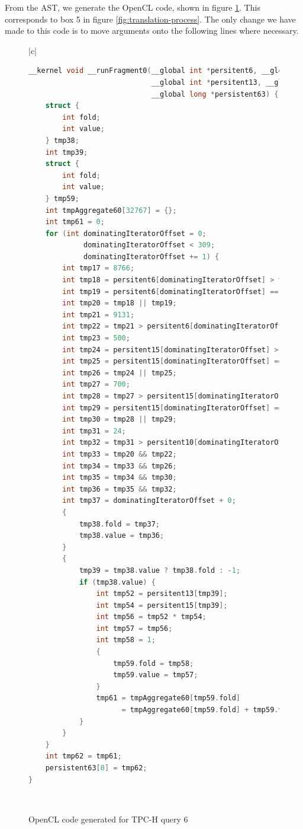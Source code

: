 From the AST, we generate the OpenCL code, shown in figure \ref{fig:q6-opencl}. This corresponds to box 5 in figure \ref{fig:translation-process}. The only change we have made to this code is to move arguments onto the following lines where necessary.

\begin{figure}[p]
    \centering
    \begin{tabular}{|c|}
    \hline
    \begin{lstlisting}[language=C]
__kernel void __runFragment0(__global int *persitent6, __global int *persitent10,
                             __global int *persitent13, __global int *persitent15,
                             __global long *persistent63) {
    struct {
        int fold;
        int value;
    } tmp38;
    int tmp39;
    struct {
        int fold;
        int value;
    } tmp59;
    int tmpAggregate60[32767] = {};
    int tmp61 = 0;
    for (int dominatingIteratorOffset = 0;
             dominatingIteratorOffset < 309;
             dominatingIteratorOffset += 1) {
        int tmp17 = 8766;
        int tmp18 = persitent6[dominatingIteratorOffset] > tmp17;
        int tmp19 = persitent6[dominatingIteratorOffset] == tmp17;
        int tmp20 = tmp18 || tmp19;
        int tmp21 = 9131;
        int tmp22 = tmp21 > persitent6[dominatingIteratorOffset];
        int tmp23 = 500;
        int tmp24 = persitent15[dominatingIteratorOffset] > tmp23;
        int tmp25 = persitent15[dominatingIteratorOffset] == tmp23;
        int tmp26 = tmp24 || tmp25;
        int tmp27 = 700;
        int tmp28 = tmp27 > persitent15[dominatingIteratorOffset];
        int tmp29 = persitent15[dominatingIteratorOffset] == tmp27;
        int tmp30 = tmp28 || tmp29;
        int tmp31 = 24;
        int tmp32 = tmp31 > persitent10[dominatingIteratorOffset];
        int tmp33 = tmp20 && tmp22;
        int tmp34 = tmp33 && tmp26;
        int tmp35 = tmp34 && tmp30;
        int tmp36 = tmp35 && tmp32;
        int tmp37 = dominatingIteratorOffset + 0;
        {
            tmp38.fold = tmp37;
            tmp38.value = tmp36;
        }
        {
            tmp39 = tmp38.value ? tmp38.fold : -1;
            if (tmp38.value) {
                int tmp52 = persitent13[tmp39];
                int tmp54 = persitent15[tmp39];
                int tmp56 = tmp52 * tmp54;
                int tmp57 = tmp56;
                int tmp58 = 1;
                {
                    tmp59.fold = tmp58;
                    tmp59.value = tmp57;
                }
                tmp61 = tmpAggregate60[tmp59.fold]
                      = tmpAggregate60[tmp59.fold] + tmp59.value;
            }
        }
    }
    int tmp62 = tmp61;
    persistent63[0] = tmp62;
}
    \end{lstlisting} \\
    \hline
    \end{tabular}
    \caption{OpenCL code generated for TPC-H query 6}
    \label{fig:q6-opencl}
\end{figure}

